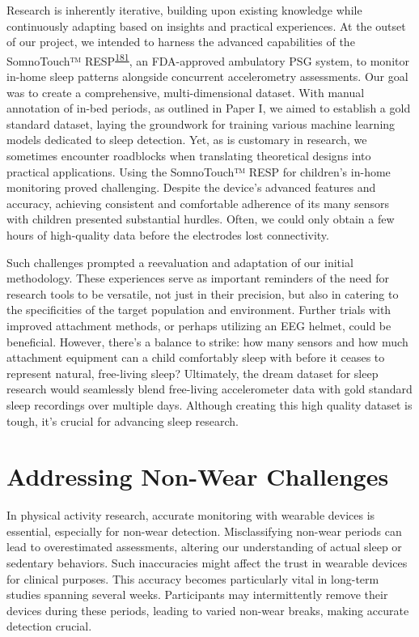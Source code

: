 \documentclass[
  10pt,
]{scrbook}
\begin{document}
Research is inherently iterative, building upon existing knowledge while
continuously adapting based on insights and practical experiences. At
the outset of our project, we intended to harness the advanced
capabilities of the SomnoTouch™️
RESP\textsuperscript{\protect\hyperlink{ref-somnotouch}{181}}, an
FDA-approved ambulatory PSG system, to monitor in-home sleep patterns
alongside concurrent accelerometry assessments. Our goal was to create a
comprehensive, multi-dimensional dataset. With manual annotation of
in-bed periods, as outlined in Paper I, we aimed to establish a gold
standard dataset, laying the groundwork for training various machine
learning models dedicated to sleep detection. Yet, as is customary in
research, we sometimes encounter roadblocks when translating theoretical
designs into practical applications. Using the SomnoTouch™️ RESP for
children's in-home monitoring proved challenging. Despite the device's
advanced features and accuracy, achieving consistent and comfortable
adherence of its many sensors with children presented substantial
hurdles. Often, we could only obtain a few hours of high-quality data
before the electrodes lost connectivity.

Such challenges prompted a reevaluation and adaptation of our initial
methodology. These experiences serve as important reminders of the need
for research tools to be versatile, not just in their precision, but
also in catering to the specificities of the target population and
environment. Further trials with improved attachment methods, or perhaps
utilizing an EEG helmet, could be beneficial. However, there's a balance
to strike: how many sensors and how much attachment equipment can a
child comfortably sleep with before it ceases to represent natural,
free-living sleep? Ultimately, the dream dataset for sleep research
would seamlessly blend free-living accelerometer data with gold standard
sleep recordings over multiple days. Although creating this high quality
dataset is tough, it's crucial for advancing sleep research.

\hypertarget{addressing-non-wear-challenges}{%
\section{Addressing Non-Wear
Challenges}\label{addressing-non-wear-challenges}}

In physical activity research, accurate monitoring with wearable devices
is essential, especially for non-wear detection. Misclassifying non-wear
periods can lead to overestimated assessments, altering our
understanding of actual sleep or sedentary behaviors. Such inaccuracies
might affect the trust in wearable devices for clinical purposes. This
accuracy becomes particularly vital in long-term studies spanning
several weeks. Participants may intermittently remove their devices
during these periods, leading to varied non-wear breaks, making accurate
detection crucial.
\end{document}
